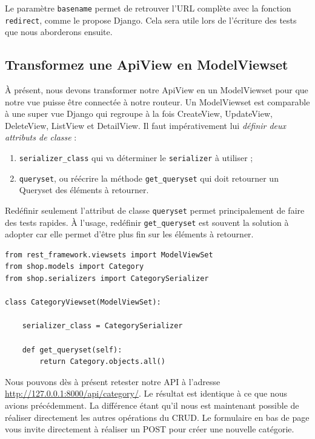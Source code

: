 \documentclass[a4paper]{article}
\begin{document}
\begin{theorem}
Le paramètre {\tt basename}  permet de retrouver l’URL complète avec la fonction {\tt redirect}, comme le propose Django. Cela sera utile lors de l’écriture des tests que nous aborderons ensuite.
\end{theorem}

\subsection{Transformez une ApiView en ModelViewset}
À présent, nous devons transformer notre  {\color{monOrange}ApiView}  en un  {\color{monOrange}ModelViewset} pour que notre vue puisse être connectée à notre routeur. Un {\color{monOrange}ModelViewset}  est comparable à une super vue Django qui regroupe à la fois {\color{monOrange}CreateView, UpdateView, DeleteView, ListView}  et {\color{monOrange}DetailView}. Il faut impérativement lui {\em définir deux attributs de classe }:
\begin{enumerate}
\item {\tt serializer\_class}  qui va déterminer le {\tt serializer} à utiliser ;
\item {\tt queryset}, ou réécrire la méthode {\tt get\_queryset}  qui doit retourner un {\color{monOrange}Queryset} des éléments à retourner.
\end{enumerate}
\begin{theorem}
Redéfinir seulement l’attribut de classe {\tt queryset}  permet principalement de faire des tests rapides. À l’usage, redéfinir {\tt get\_queryset}  est souvent la solution à adopter car elle permet d’être plus fin sur les éléments à retourner.
\end{theorem}
\begin{verbatim}
from rest_framework.viewsets import ModelViewSet
from shop.models import Category
from shop.serializers import CategorySerializer
 
class CategoryViewset(ModelViewSet):
 
    serializer_class = CategorySerializer
 
    def get_queryset(self):
        return Category.objects.all()
\end{verbatim}
Nous pouvons dès à présent retester notre API à l’adresse \url{http://127.0.0.1:8000/api/category/}.
Le résultat est identique à ce que nous avions précédemment. La différence étant qu’il nous est maintenant possible de réaliser directement les autres opérations du {\color{monOrange}CRUD}. Le formulaire en bas de page vous invite directement à réaliser un {\color{monOrange}POST} pour créer une nouvelle catégorie.
\end{document}
